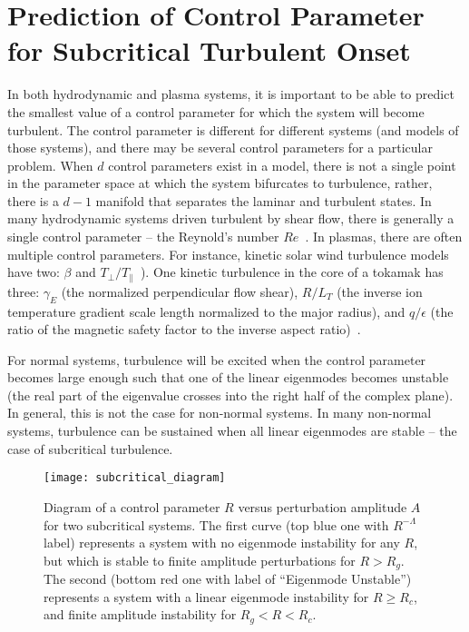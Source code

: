 \documentclass[letter,scriptaddress,twocolumn, prl,showkeys]{revtex4}
\def\para{\parallel}
\begin{document}
\section{Prediction of Control Parameter for Subcritical Turbulent Onset}

In both hydrodynamic and plasma systems, it is important to be able to predict the smallest value of a control parameter for which the system will become turbulent. 
The control parameter is different for different systems (and models of those systems), and there may be several control parameters for a particular problem. When $d$ control parameters exist in a model, 
there is not a single point in the parameter space at which the system bifurcates to turbulence, rather, there is a $d-1$ manifold that separates the laminar and turbulent states.
In many hydrodynamic systems driven turbulent by shear flow, there is generally a single control parameter -- the Reynold's number $Re$~\cite{drazin1981}.
In plasmas, there are often multiple control parameters. For instance, kinetic solar wind turbulence models have two: $\beta$ and $T_\perp/T_\para$~\cite{camporeale2010}). One kinetic turbulence in the
core of a tokamak has three: $\gamma_E$ (the normalized perpendicular flow shear), $R/L_T$ (the inverse ion temperature gradient scale length normalized to the major radius), and $q/\epsilon$
(the ratio of the magnetic safety factor to the inverse aspect ratio)~\cite{highcock2012}.

For normal systems, turbulence will be excited when the control parameter becomes large enough such that one of the linear eigenmodes becomes unstable (the real part of the eigenvalue crosses into the
right half of the complex plane). In general, this is not the case for non-normal systems. In many non-normal systems, turbulence can be sustained when all linear eigenmodes are stable --
the case of subcritical turbulence. 

\begin{figure}
\centerline{\texttt{[image: subcritical\_diagram]}}
\caption{Diagram of a control parameter $R$ versus perturbation amplitude $A$ for two subcritical systems. The first curve (top blue one with $R^{-\Lambda}$ label) represents a system with no
eigenmode instability for any $R$, but which is stable to finite amplitude perturbations for $R > R_g$. 
The second (bottom red one with label of ``Eigenmode Unstable'') represents a system with a linear eigenmode instability for $R \ge R_c$, and finite amplitude
instability for $R_g < R < R_c$.}
\label{subcritical_diagram}
\end{figure}
\end{document}
